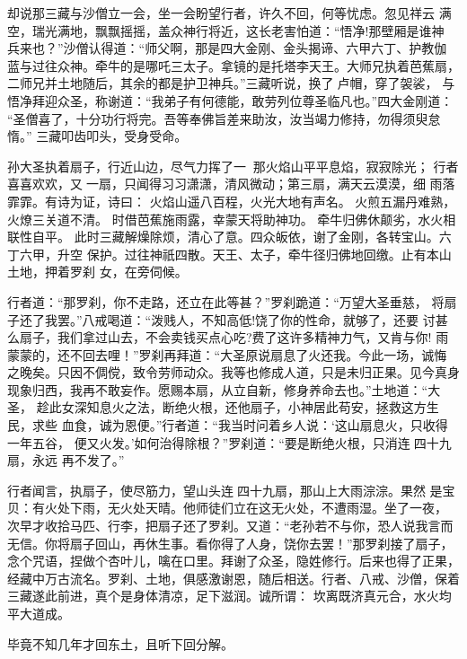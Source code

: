 却说那三藏与沙僧立一会，坐一会盼望行者，许久不回，何等忧虑。忽见祥云
满空，瑞光满地，飘飘摇摇，盖众神行将近，这长老害怕道：“悟净!那壁厢是谁神
兵来也？”沙僧认得道：“师父啊，那是四大金刚、金头揭谛、六甲六丁、护教伽
蓝与过往众神。牵牛的是哪吒三太子。拿镜的是托塔李天王。大师兄执着芭蕉扇，
二师兄并土地随后，其余的都是护卫神兵。”三藏听说，换了卢帽，穿了袈裟，
与悟净拜迎众圣，称谢道：“我弟子有何德能，敢劳列位尊圣临凡也。”四大金刚道：
“圣僧喜了，十分功行将完。吾等奉佛旨差来助汝，汝当竭力修持，勿得须臾怠惰。”
三藏叩齿叩头，受身受命。

孙大圣执着扇子，行近山边，尽气力挥了一，那火焰山平平息焰，寂寂除光；
行者喜喜欢欢，又一扇，只闻得习习潇潇，清风微动；第三扇，满天云漠漠，细
雨落霏霏。有诗为证，诗曰：
火焰山遥八百程，火光大地有声名。
火煎五漏丹难熟，火燎三关道不清。
时借芭蕉施雨露，幸蒙天将助神功。
牵牛归佛休颠劣，水火相联性自平。
此时三藏解燥除烦，清心了意。四众皈依，谢了金刚，各转宝山。六丁六甲，升空
保护。过往神祇四散。天王、太子，牵牛径归佛地回缴。止有本山土地，押着罗刹
女，在旁伺候。

行者道：“那罗刹，你不走路，还立在此等甚？”罗刹跪道：“万望大圣垂慈，
将扇子还了我罢。”八戒喝道：“泼贱人，不知高低!饶了你的性命，就够了，还要
讨甚么扇子，我们拿过山去，不会卖钱买点心吃?费了这许多精神力气，又肯与你!
雨蒙蒙的，还不回去哩！”罗刹再拜道：“大圣原说扇息了火还我。今此一场，诚悔
之晚矣。只因不倜傥，致令劳师动众。我等也修成人道，只是未归正果。见今真身
现象归西，我再不敢妄作。愿赐本扇，从立自新，修身养命去也。”土地道：“大圣，
趁此女深知息火之法，断绝火根，还他扇子，小神居此苟安，拯救这方生民，求些
血食，诚为恩便。”行者道：“我当时问着乡人说：‘这山扇息火，只收得一年五谷，
便又火发。’如何治得除根？”罗刹道：“要是断绝火根，只消连四十九扇，永远
再不发了。”

行者闻言，执扇子，使尽筋力，望山头连四十九扇，那山上大雨淙淙。果然
是宝贝：有火处下雨，无火处天晴。他师徒们立在这无火处，不遭雨湿。坐了一夜，
次早才收拾马匹、行李，把扇子还了罗刹。又道：“老孙若不与你，恐人说我言而
无信。你将扇子回山，再休生事。看你得了人身，饶你去罢！”那罗刹接了扇子，
念个咒语，捏做个杏叶儿，噙在口里。拜谢了众圣，隐姓修行。后来也得了正果，
经藏中万古流名。罗刹、土地，俱感激谢恩，随后相送。行者、八戒、沙僧，保着
三藏遂此前进，真个是身体清凉，足下滋润。诚所谓：
坎离既济真元合，水火均平大道成。

毕竟不知几年才回东土，且听下回分解。